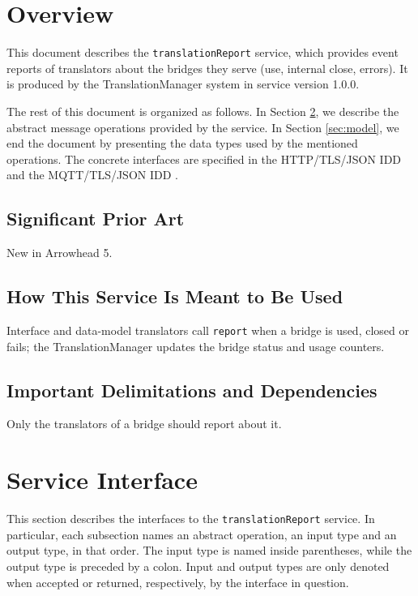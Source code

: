 \documentclass[a4paper]{arrowhead}
\begin{document}
\section{Overview}
\label{sec:overview}

This document describes the \texttt{translationReport} service, which provides event reports of translators about the bridges they serve (use, internal close, errors).
It is produced by the TranslationManager system \cite{tm-sysd} in service version 1.0.0.

The rest of this document is organized as follows.
In Section \ref{sec:operations}, we describe the abstract message operations provided by the service.
In Section \ref{sec:model}, we end the document by presenting the data types used by the mentioned operations.
The concrete interfaces are specified in the HTTP/TLS/JSON IDD \cite{tm-translationReport-http-idd} and the MQTT/TLS/JSON IDD \cite{tm-translationReport-mqtt-idd}.

\subsection{Significant Prior Art}

New in Arrowhead 5.

\subsection{How This Service Is Meant to Be Used}

Interface and data-model translators call \texttt{report} when a bridge is used, closed or fails; the Translation\allowbreak{}Manager updates the bridge status and usage counters.

\subsection{Important Delimitations and Dependencies}
\label{sec:delimitations}

Only the translators of a bridge should report about it.

\newpage

\section{Service Interface}
\label{sec:operations}

This section describes the interfaces to the \texttt{translationReport} service.
In particular, each subsection names an abstract operation, an input type and an output type, in that order.
The input type is named inside parentheses, while the output type is preceded by a colon.
Input and output types are only denoted when accepted or returned, respectively, by the interface in question.
\end{document}
